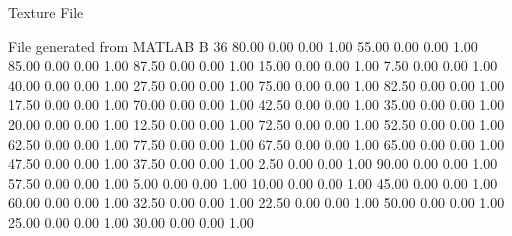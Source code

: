 Texture File
 
File generated from MATLAB
B 36
   80.00   0.00   0.00  1.00
   55.00   0.00   0.00  1.00
   85.00   0.00   0.00  1.00
   87.50   0.00   0.00  1.00
   15.00   0.00   0.00  1.00
    7.50   0.00   0.00  1.00
   40.00   0.00   0.00  1.00
   27.50   0.00   0.00  1.00
   75.00   0.00   0.00  1.00
   82.50   0.00   0.00  1.00
   17.50   0.00   0.00  1.00
   70.00   0.00   0.00  1.00
   42.50   0.00   0.00  1.00
   35.00   0.00   0.00  1.00
   20.00   0.00   0.00  1.00
   12.50   0.00   0.00  1.00
   72.50   0.00   0.00  1.00
   52.50   0.00   0.00  1.00
   62.50   0.00   0.00  1.00
   77.50   0.00   0.00  1.00
   67.50   0.00   0.00  1.00
   65.00   0.00   0.00  1.00
   47.50   0.00   0.00  1.00
   37.50   0.00   0.00  1.00
    2.50   0.00   0.00  1.00
   90.00   0.00   0.00  1.00
   57.50   0.00   0.00  1.00
    5.00   0.00   0.00  1.00
   10.00   0.00   0.00  1.00
   45.00   0.00   0.00  1.00
   60.00   0.00   0.00  1.00
   32.50   0.00   0.00  1.00
   22.50   0.00   0.00  1.00
   50.00   0.00   0.00  1.00
   25.00   0.00   0.00  1.00
   30.00   0.00   0.00  1.00
